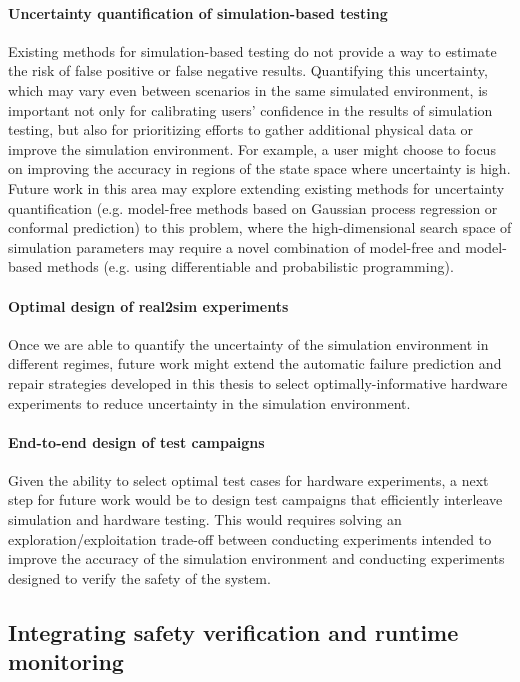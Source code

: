 \paragraph{Uncertainty quantification of simulation-based testing}
%
Existing methods for simulation-based testing do not provide a way to estimate the risk of false positive or false negative results. Quantifying this uncertainty, which may vary even between scenarios in the same simulated environment, is important not only for calibrating users' confidence in the results of simulation testing, but also for prioritizing efforts to gather additional physical data or improve the simulation environment. For example, a user might choose to focus on improving the accuracy in regions of the state space where uncertainty is high. Future work in this area may explore extending existing methods for uncertainty quantification (e.g. model-free methods based on Gaussian process regression or conformal prediction) to this problem, where the high-dimensional search space of simulation parameters may require a novel combination of model-free and model-based methods (e.g. using differentiable and probabilistic programming).

\paragraph{Optimal design of real2sim experiments}
%
Once we are able to quantify the uncertainty of the simulation environment in different regimes, future work might extend the automatic failure prediction and repair strategies developed in this thesis to select optimally-informative hardware experiments to reduce uncertainty in the simulation environment.

\paragraph{End-to-end design of test campaigns}
Given the ability to select optimal test cases for hardware experiments, a next step for future work would be to design test campaigns that efficiently interleave simulation and hardware testing. This would requires solving an exploration/exploitation trade-off between conducting experiments intended to improve the accuracy of the simulation environment and conducting experiments designed to verify the safety of the system.

\subsection{Integrating safety verification and runtime monitoring}

